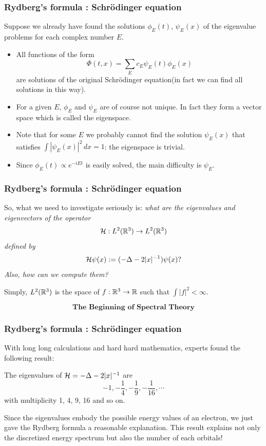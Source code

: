 \documentclass{beamer}
\begin{document}
\begin{frame}
\frametitle{Rydberg's formula : Schr\"odinger equation}
  Suppose we already have found the solutions $\phi_E(t)$, $\psi_E(x)$ of the eigenvalue problems for each complex number $E$.\pause
  \begin{itemize}[<+->]
    \item All functions of the form \[\Phi(t,x)=\sum_Ec_E\psi_E(t)\phi_E(x)\] are solutions of the original Schr\"odinger equation(in fact we can find all solutions in this way).
    \item For a given $E$, $\phi_E$ and $\psi_E$ are of course not unique. In fact they form a vector space which is called the eigenspace.
    \item Note that for some $E$ we probably cannot find the solution $\psi_E(x)$ that satisfies $\int|\psi_E(x)|^2\,dx=1$: the eigenspace is trivial.
    \item Since $\phi_E(t)\propto e^{-iEt}$ is easily solved, the main difficulty is $\psi_E$.
  \end{itemize}
\end{frame}

\begin{frame}
\frametitle{Rydberg's formula : Schr\"odinger equation}
  So, what we need to investigate seriously is:
  \pause\emph{what are the eigenvalues and eigenvectors of the operator}
  \[\cH:L^2(\R^3)\to L^2(\R^3)\]
  \emph{defined by}
  \[\mathcal{H}\psi(x):=(-\Delta-2|x|^{-1})\psi(x)?\]
  \emph{Also, how can we compute them?}
  \pause
  \begin{rmk} Simply, $L^2(\mathbb{R}^3)$ is the space of $f:\R^3\to\R$ such that $\int|f|^2<\infty$.\end{rmk}
  \pause \[\textbf{The Beginning of Spectral Theory}\]
\end{frame}

\begin{frame}
\frametitle{Rydberg's formula : Schr\"odinger equation}
  With long long calculations and hard hard mathematics, experts found the following result: \pause
  \begin{prop}
    The eigenvalues of $\mathcal{H}=-\Delta-2|x|^{-1}$ are \pause
    \[-1,-\frac14,-\frac19,-\frac1{16},\cdots\]
    \pause with multiplicity 1, 4, 9, 16 and so on.
  \end{prop}
  \pause Since the eigenvalues embody the possible energy values of an electron, we just gave the Rydberg formula a reasonable explanation.
  \pause This result explains not only the discretized energy spectrum but also the number of each orbitals!
\end{frame}
\end{document}

